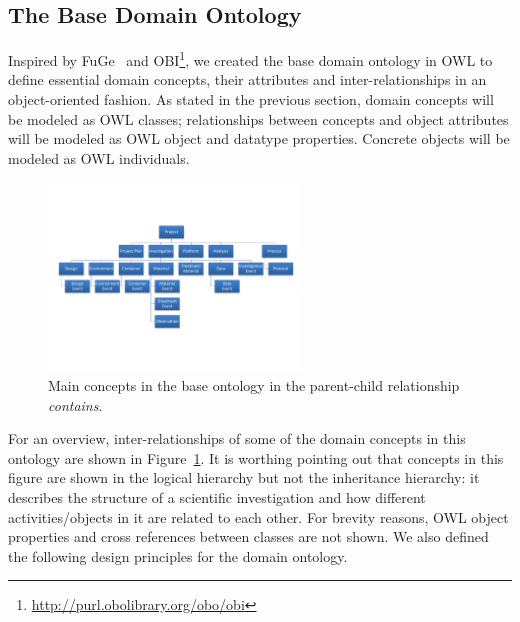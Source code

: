 \documentclass{llncs}
\begin{document}
\subsection{The Base Domain Ontology}
Inspired by FuGe~\cite{citeulike:1756058} and
OBI\footnote{\url{http://purl.obolibrary.org/obo/obi}}, we created the
base domain ontology in OWL to define essential domain concepts, their
attributes and inter-relationships in an object-oriented fashion. As
stated in the previous section, domain concepts will be modeled as OWL
classes; relationships between concepts and object attributes will be
modeled as OWL object and datatype properties. Concrete objects will be
modeled as OWL individuals.

\vspace{-16pt}
\begin{figure}[htb]
\centering
\includegraphics[trim = 5mm 30mm 5mm 46mm, clip,height=50mm]{ont_high.pdf}
\vspace{-16pt} \caption{Main concepts in the base
ontology in the parent-child relationship \emph{contains}.}\label{fig:ont_high}
\end{figure}

\vspace{-16pt}
For an overview, inter-relationships of some of the domain concepts in
this ontology are shown in Figure~\ref{fig:ont_high}. It is worthing 
pointing out that concepts in this figure are shown in the logical 
hierarchy but not the inheritance hierarchy: it describes the structure 
of a scientific investigation and
how different activities/objects in it are related to each other.
For brevity reasons, OWL object properties and cross
references between classes are not shown. We also defined the following
design principles for the domain ontology. 
\end{document}
